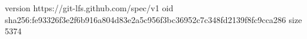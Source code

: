 version https://git-lfs.github.com/spec/v1
oid sha256:fe93326f3e2f6b916a804d83e2a5c956f3bc36952c7c348fd2139f8fc9cca286
size 5374
